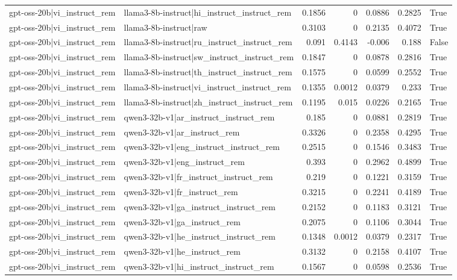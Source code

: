 \begin{table}
\begin{tabular}{l l r r r r l}
gpt-oss-20b|vi_instruct_rem & llama3-8b-instruct|hi_instruct_instruct_rem & 0.1856 & 0 & 0.0886 & 0.2825 & True \\
gpt-oss-20b|vi_instruct_rem & llama3-8b-instruct|raw & 0.3103 & 0 & 0.2135 & 0.4072 & True \\
gpt-oss-20b|vi_instruct_rem & llama3-8b-instruct|ru_instruct_instruct_rem & 0.091 & 0.4143 & -0.006 & 0.188 & False \\
gpt-oss-20b|vi_instruct_rem & llama3-8b-instruct|sw_instruct_instruct_rem & 0.1847 & 0 & 0.0878 & 0.2816 & True \\
gpt-oss-20b|vi_instruct_rem & llama3-8b-instruct|th_instruct_instruct_rem & 0.1575 & 0 & 0.0599 & 0.2552 & True \\
gpt-oss-20b|vi_instruct_rem & llama3-8b-instruct|vi_instruct_instruct_rem & 0.1355 & 0.0012 & 0.0379 & 0.233 & True \\
gpt-oss-20b|vi_instruct_rem & llama3-8b-instruct|zh_instruct_instruct_rem & 0.1195 & 0.015 & 0.0226 & 0.2165 & True \\
gpt-oss-20b|vi_instruct_rem & qwen3-32b-v1|ar_instruct_instruct_rem & 0.185 & 0 & 0.0881 & 0.2819 & True \\
gpt-oss-20b|vi_instruct_rem & qwen3-32b-v1|ar_instruct_rem & 0.3326 & 0 & 0.2358 & 0.4295 & True \\
gpt-oss-20b|vi_instruct_rem & qwen3-32b-v1|eng_instruct_instruct_rem & 0.2515 & 0 & 0.1546 & 0.3483 & True \\
gpt-oss-20b|vi_instruct_rem & qwen3-32b-v1|eng_instruct_rem & 0.393 & 0 & 0.2962 & 0.4899 & True \\
gpt-oss-20b|vi_instruct_rem & qwen3-32b-v1|fr_instruct_instruct_rem & 0.219 & 0 & 0.1221 & 0.3159 & True \\
gpt-oss-20b|vi_instruct_rem & qwen3-32b-v1|fr_instruct_rem & 0.3215 & 0 & 0.2241 & 0.4189 & True \\
gpt-oss-20b|vi_instruct_rem & qwen3-32b-v1|ga_instruct_instruct_rem & 0.2152 & 0 & 0.1183 & 0.3121 & True \\
gpt-oss-20b|vi_instruct_rem & qwen3-32b-v1|ga_instruct_rem & 0.2075 & 0 & 0.1106 & 0.3044 & True \\
gpt-oss-20b|vi_instruct_rem & qwen3-32b-v1|he_instruct_instruct_rem & 0.1348 & 0.0012 & 0.0379 & 0.2317 & True \\
gpt-oss-20b|vi_instruct_rem & qwen3-32b-v1|he_instruct_rem & 0.3132 & 0 & 0.2158 & 0.4107 & True \\
gpt-oss-20b|vi_instruct_rem & qwen3-32b-v1|hi_instruct_instruct_rem & 0.1567 & 0 & 0.0598 & 0.2536 & True \\

\end{tabular}
\end{table}

